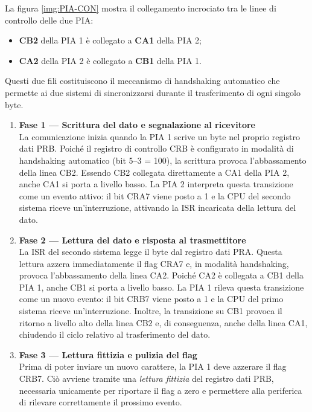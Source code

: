 La figura \ref{img:PIA-CON} mostra il collegamento incrociato tra le linee di controllo delle due PIA:

\begin{itemize}
    \item \textbf{CB2} della PIA 1 è collegato a \textbf{CA1} della PIA 2;
    \item \textbf{CA2} della PIA 2 è collegato
a \textbf{CB1} della PIA 1.
\end{itemize}
Questi due fili costituiscono il meccanismo di handshaking automatico che
permette ai due sistemi di sincronizzarsi durante il trasferimento di ogni singolo byte.

\begin{enumerate}
    \item \textbf{Fase 1 — Scrittura del dato e segnalazione al ricevitore}  \\
    La comunicazione inizia quando la PIA 1 scrive un byte nel proprio registro dati PRB. 
    Poiché il registro di controllo CRB è configurato in modalità di handshaking automatico 
    (bit 5--3 = 100), la scrittura provoca l’abbassamento della linea CB2. 
    Essendo CB2 collegata direttamente a CA1 della PIA 2, anche CA1 si porta a livello basso. 
    La PIA 2 interpreta questa transizione come un evento attivo: il bit CRA7 viene posto a 1 
    e la CPU del secondo sistema riceve un’interruzione, attivando la ISR incaricata della lettura del dato.

    \item \textbf{Fase 2 — Lettura del dato e risposta al trasmettitore}  \\
    La ISR del secondo sistema legge il byte dal registro dati PRA. Questa lettura azzera 
    immediatamente il flag CRA7 e, in modalità handshaking, provoca l’abbassamento della linea 
    CA2. Poiché CA2 è collegata a CB1 della PIA 1, anche CB1 si porta a livello basso. 
    La PIA 1 rileva questa transizione come un nuovo evento: il bit CRB7 viene posto a 1 e la CPU 
    del primo sistema riceve un’interruzione. Inoltre, la transizione su CB1 provoca il ritorno a livello 
    alto della linea CB2 e, di conseguenza, anche della linea CA1, chiudendo il ciclo 
    relativo al trasferimento del dato.

    \item \textbf{Fase 3 — Lettura fittizia e pulizia del flag}  \\
    Prima di poter inviare un nuovo carattere, la PIA 1 deve azzerare il flag CRB7. Ciò avviene 
    tramite una \textit{lettura fittizia} del registro dati PRB, necessaria unicamente per riportare 
    il flag a zero e permettere alla periferica di rilevare correttamente il prossimo evento.


\end{enumerate}
